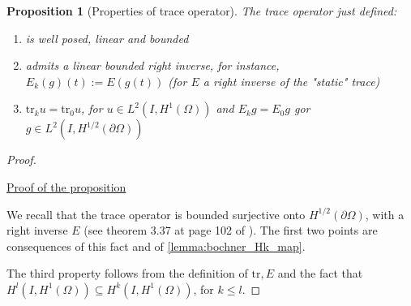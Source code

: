 \documentclass[english,a4paper,9pt,oneside]{scrbook}	%
\theoremstyle{break}
\newtheorem{prop}[equation]{Proposition}
\newenvironment{mproof}[1][\proofname]{%
  \begin{proof}[#1]$ $\par\nobreak\ignorespaces
}{%
  \end{proof}
}
\renewcommand*{\proofname}{Proof}
\theoremstyle{remark}
\newcommand{\tr}{\text{tr}}
\newcommand{\emb}{\hookrightarrow}
\begin{document}
\begin{appendices}
\begin{prop}[Properties of trace operator]
\label{prop:trace}
The trace operator just defined:
\begin{enumerate}
\item is well posed, linear and bounded
\item admits a linear bounded right inverse, for instance, $E_k(g)(t):=E(g(t))$ (for $E$ a right inverse of the "static" trace)
\item $\tr_k u = \tr_0 u$, for $u \in L^2(I,H^1(\Omega))$ and $E_k g = E_0g$ gor $g \in L^2(I,H^{1/2}(\partial \Omega))$
\end{enumerate}
\end{prop}
\begin{mproof}

\underline{Proof of the proposition}

We recall that the trace operator is bounded surjective onto $H^{1/2}(\partial \Omega)$, with a right inverse $E$ (see theorem 3.37 at page 102 of \cite{mclean}). The first two points are consequences of this fact and of \cref{lemma:bochner_Hk_map}.

The third property follows from the definition of $\tr, E$ and the fact that $H^l(I,H^1(\Omega))\subseteq H^k(I,H^1(\Omega))$, for $k\leq l$.



\end{mproof}
\end{appendices}
\end{document}
